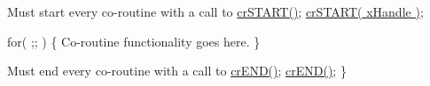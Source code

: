 \begin{DoxyPre}Must start every co-routine with a call to \hyperlink{croutine_8h_a19a57a201a325e8af1207ed68c4aedde}{crSTART()};
     \hyperlink{croutine_8h_a19a57a201a325e8af1207ed68c4aedde}{crSTART( xHandle )};\end{DoxyPre}



\begin{DoxyPre}     for( ;; )
     \{
Co-routine functionality goes here.
     \}\end{DoxyPre}



\begin{DoxyPre}Must end every co-routine with a call to \hyperlink{croutine_8h_ae6038cc976689b50000475ebfc4e2f23}{crEND()};
     \hyperlink{croutine_8h_ae6038cc976689b50000475ebfc4e2f23}{crEND()};
 \}\end{DoxyPre}
 